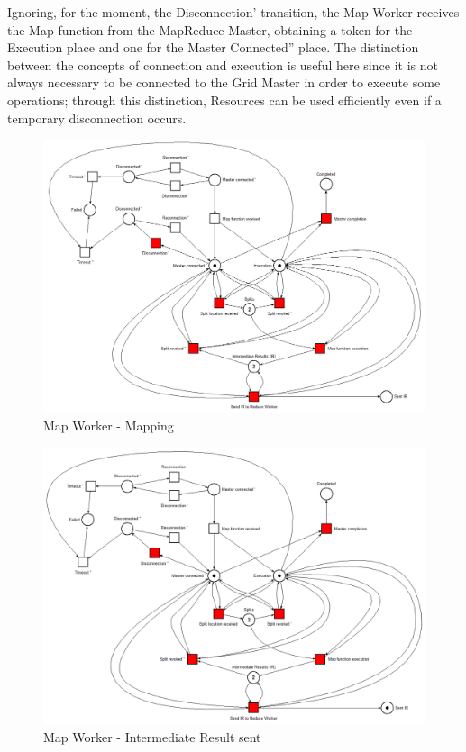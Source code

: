 Ignoring, for the moment, the Disconnection' transition, the Map Worker receives the Map function from the MapReduce Master, obtaining a token for the Execution place and one for the Master Connected'' place. The distinction between the concepts of connection and execution is useful here since it is not always necessary to be connected to the Grid Master in order to execute some operations; through this distinction, Resources can be used efficiently even if a temporary disconnection occurs.

\begin{figure}[!ht]
    \centering
    \includegraphics[width=\linewidth]{document/chapters/chapter_6/images/map_worker_petri_net_2.png}
    \caption{Map Worker - Mapping}
    \label{fig:map_worker_petri_net_2}
\end{figure}

\begin{figure}[!ht]
    \centering
    \includegraphics[width=\linewidth]{document/chapters/chapter_6/images/map_worker_petri_net_3.png}
    \caption{Map Worker - Intermediate Result sent}
    \label{fig:map_worker_petri_net_3}
\end{figure}

